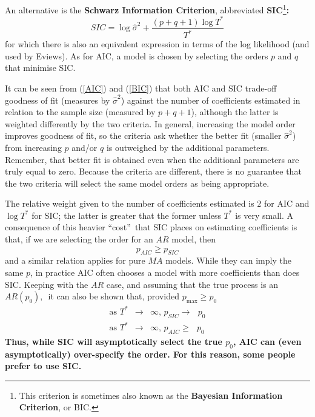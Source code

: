 \documentclass[openany]{tufte-book} %
\begin{document}
An alternative is the \textbf{Schwarz Information Criterion}, abbreviated
\textbf{SIC}\footnote{%
	This criterion is sometimes also known as the \textbf{Bayesian Information
		Criterion}, or BIC.}\textbf{:}
\begin{equation}
SIC=\log \hat{\sigma}^{2}+\frac{\left( p+q+1\right) \log T^{\ast }}{T^{\ast }%
}  \label{BIC}
\end{equation}%
for which there is also an equivalent expression in terms of the log
likelihood (and used by Eviews). As for AIC, a model is chosen by selecting
the orders $p$ and $q$ that minimise SIC.

It can be seen from (\ref{AIC}) and (\ref{BIC}) that both AIC and SIC
trade-off goodness of fit (measures by $\hat{\sigma}^{2}$) against the
number of coefficients estimated in relation to the sample size (measured by
$p+q+1$), although the latter is weighted differently by the two criteria.
In general, increasing the model order improves goodness of fit, so the
criteria ask whether the better fit (smaller $\hat{\sigma}^{2}$) from
increasing $p$ and/or $q$ is outweighed by the additional parameters.
Remember, that better fit is obtained even when the additional parameters
are truly equal to zero. Because the criteria are different, there is no
guarantee that the two criteria will select the same model orders as being
appropriate.

The relative weight given to the number of coefficients estimated is $2$ for
AIC and $\log T^{\ast }$ for SIC; the latter is greater that the former
unless $T^{\ast }$ is very small. A consequence of this heavier
\textquotedblleft cost\textquotedblright\ that SIC places on estimating
coefficients is that, if we are selecting the order for an $AR$ model, then%
\begin{equation}
p_{AIC}\geq p_{SIC}  \label{AIC-SIC order}
\end{equation}%
and a similar relation applies for pure $MA$ models. While they can imply
the same $p$, in practice AIC often chooses a model with more coefficients
than does SIC. Keeping with the $AR$ case, and assuming that the true
process is an $AR(p_{0}),$\ it can also be shown that, provided $p_{\max
}\geq p_{0}$
\begin{eqnarray*}
	\text{as }T^{\ast } &\rightarrow &\infty \text{, }p_{SIC}\rightarrow \text{ }%
	p_{0} \\
	\text{as }T^{\ast } &\rightarrow &\infty \text{, }p_{AIC}\geq \text{ }p_{0}
\end{eqnarray*}%
\textbf{Thus, while SIC will asymptotically select the true $p_{0}$, AIC can (even
asymptotically) over-specify the order. For this reason, some people prefer
to use SIC.}
\end{document}
